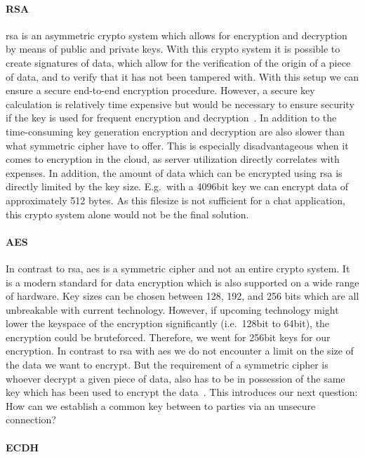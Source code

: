 \paragraph{RSA}
\ac{rsa} is an asymmetric crypto system which allows for encryption and decryption by means of public and private keys.
With this crypto system it is possible to create signatures of data, which allow for the verification of the origin of
a piece of data, and to verify that it has not been tampered with.
With this setup we can ensure a secure end-to-end encryption procedure.
However, a secure key calculation is relatively time expensive but would be necessary to ensure security if the key
is used for frequent encryption and decryption~\cite{rsa}.
In addition to the time-consuming key generation encryption and decryption are also slower than what symmetric
cipher have to offer.
This is especially disadvantageous when it comes to encryption in the cloud, as server utilization directly correlates
with expenses.
In addition, the amount of data which can be encrypted using \ac{rsa} is directly limited by the key size.
E.g.\ with a 4096bit key we can encrypt data of approximately 512 bytes.
As this filesize is not sufficient for a chat application, this crypto system alone would not be the final solution.

\paragraph{AES}
In contrast to \ac{rsa}, \ac{aes} is a symmetric cipher and not an entire crypto system.
It is a modern standard for data encryption which is also supported on a wide range of hardware.
Key sizes can be chosen between 128, 192, and 256 bits which are all unbreakable with current technology.
However, if upcoming technology might lower the keyspace of the encryption significantly (i.e.\ 128bit to 64bit),
the encryption could be bruteforced.
Therefore, we went for 256bit keys for our encryption.
In contrast to \ac{rsa} with \ac{aes} we do not encounter a limit on the size of the data we want to encrypt.
But the requirement of a symmetric cipher is whoever decrypt a given piece of data, also has to be in possession of the
same key which has been used to encrypt the data~\cite{aes}.
This introduces our next question: How can we establish a common key between to parties via an unsecure connection?

\paragraph{ECDH}



